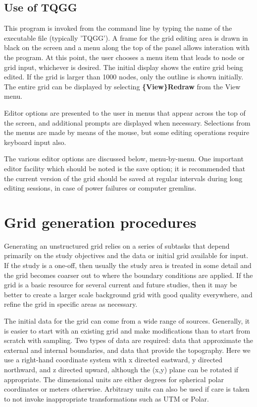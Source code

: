 \documentclass{article}
\begin{document}
\subsection{Use of TQGG}
This program is invoked from the command line by typing the name of the executable file (typically 'TQGG'). A frame for the grid editing area is drawn in black on the screen and a menu along the top of the panel allows interation with the program. At this point, the user chooses a menu item that leads to node or grid input, whichever is desired. The initial display shows the entire grid being edited.  If the grid is larger than 1000 nodes, only the outline is shown initially. The entire grid can be displayed by selecting \textbf{\{View\}Redraw} from the View menu.

Editor options are presented to the user in menus that appear across the top of the screen, and additional prompts are displayed when necessary. Selections from the menus are made by means of the mouse, but some editing operations require keyboard input also.

The various editor options are discussed below, menu-by-menu. One important editor facility which should be noted is the save option; it is recommended that the current version of the grid should be saved at regular intervals during long editing sessions, in case of power failures or computer gremlins.

\section{Grid generation procedures}

Generating an unstructured grid relies on a series of subtasks that depend primarily on the study objectives and the
data or initial grid available for input. If the study is a one-off, then usually the study area is treated in some detail and the
grid becomes coarser out to where the boundary conditions are applied. If the grid is a basic resource for several
current and future studies, then it may be better to create a larger scale background grid with good quality everywhere,
and refine the grid in specific areas as necessary.

The initial data for the grid can come from a wide range of sources. Generally, it is easier to start with an existing grid
and make modifications than to start from scratch with sampling. Two types of data are required: data that approximate 
the external and internal boundaries, and data that provide the topography. Here we use a right-hand coordinate system
with x directed eastward, y directed northward, and z directed upward, although the (x,y) plane can be rotated if
appropriate. The dimensional units are either degrees for spherical polar coordinates or meters otherwise. Arbitrary
units can also be used if care is taken to not invoke inappropriate transformations such as UTM or Polar.
\end{document}
